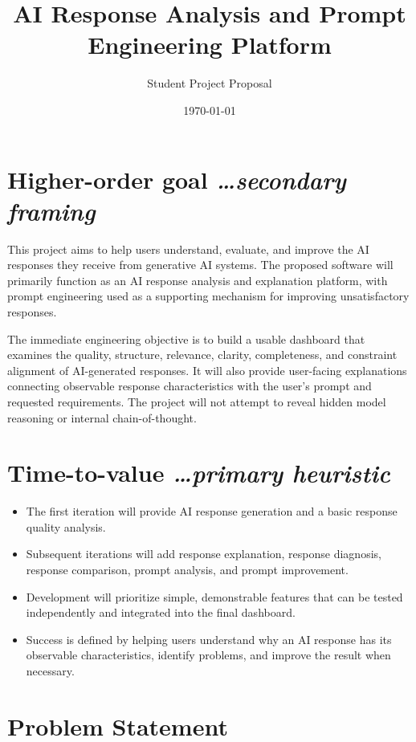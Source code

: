 \documentclass[11pt,a4paper]{article}
\title{AI Response Analysis and Prompt Engineering Platform}
\author{Student Project Proposal}
\date{\today}
\newcommand{\BvrHint}[1]{%
  {\normalfont\normalsize\itshape\hfill #1}}
\begin{document}
\maketitle

\section{Higher-order goal%
  \BvrHint{\ldots secondary framing}}

This project aims to help users understand, evaluate, and improve the AI
responses they receive from generative AI systems. The proposed software will
primarily function as an AI response analysis and explanation platform, with
prompt engineering used as a supporting mechanism for improving unsatisfactory
responses.

The immediate engineering objective is to build a usable dashboard that
examines the quality, structure, relevance, clarity, completeness, and
constraint alignment of AI-generated responses. It will also provide
user-facing explanations connecting observable response characteristics with
the user's prompt and requested requirements. The project will not attempt to
reveal hidden model reasoning or internal chain-of-thought.

\section{Time-to-value%
  \BvrHint{\ldots primary heuristic}}

\begin{itemize}[leftmargin=0.7cm]
    \item The first iteration will provide AI response generation and a
    basic response quality analysis.
    \item Subsequent iterations will add response explanation, response
    diagnosis, response comparison, prompt analysis, and prompt improvement.
    \item Development will prioritize simple, demonstrable features that can
    be tested independently and integrated into the final dashboard.
    \item Success is defined by helping users understand why an AI response
    has its observable characteristics, identify problems, and improve the
    result when necessary.
\end{itemize}

\section{Problem Statement}
\end{document}
